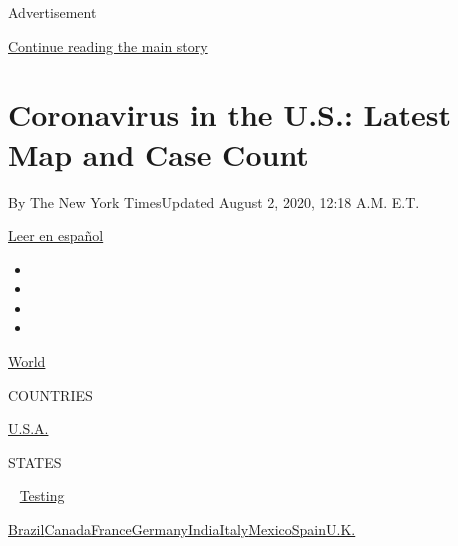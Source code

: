 Advertisement

\protect\hyperlink{after-top}{Continue reading the main story}

\hypertarget{coronavirus-in-the-us-latest-map-and-case-count}{%
\section{Coronavirus in the U.S.: Latest Map and Case
Count}\label{coronavirus-in-the-us-latest-map-and-case-count}}

By The New York TimesUpdated August 2, 2020, 12:18 A.M. E.T.

\href{https://www.nytimes.com/es/interactive/2020/espanol/mundo/coronavirus-en-estados-unidos.html}{Leer
en español}

\begin{itemize}
\item
\item
\item
\item
\end{itemize}

\href{https://www.nytimes.com/interactive/2020/world/coronavirus-maps.html}{World}~

COUNTRIES

\textbar{}
\href{https://www.nytimes.com/interactive/2020/us/coronavirus-us-cases.html}{U.S.A.}~

STATES

~
\href{https://www.nytimes.com/interactive/2020/us/coronavirus-testing.html}{Testing}

\href{https://www.nytimes.com/interactive/2020/world/americas/brazil-coronavirus-cases.html}{Brazil}\href{https://www.nytimes.com/interactive/2020/world/canada/canada-coronavirus-cases.html}{Canada}\href{https://www.nytimes.com/interactive/2020/world/europe/france-coronavirus-cases.html}{France}\href{https://www.nytimes.com/interactive/2020/world/europe/germany-coronavirus-cases.html}{Germany}\href{https://www.nytimes.com/interactive/2020/world/asia/india-coronavirus-cases.html}{India}\href{https://www.nytimes.com/interactive/2020/world/europe/italy-coronavirus-cases.html}{Italy}\href{https://www.nytimes.com/interactive/2020/world/americas/mexico-coronavirus-cases.html}{Mexico}\href{https://www.nytimes.com/interactive/2020/world/europe/spain-coronavirus-cases.html}{Spain}\href{https://www.nytimes.com/interactive/2020/world/europe/united-kingdom-coronavirus-cases.html}{U.K.}

